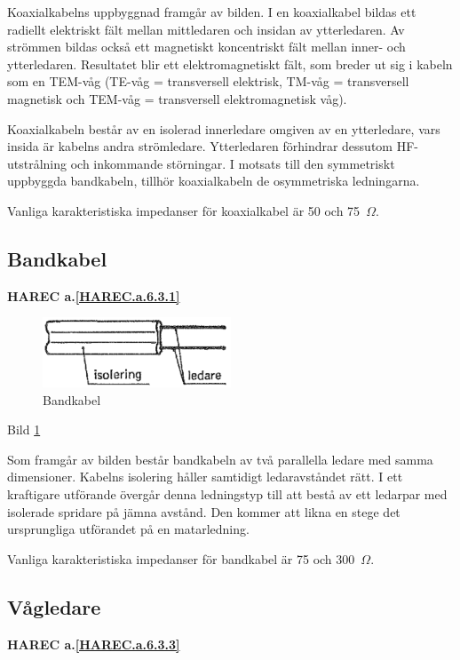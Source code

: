 Koaxialkabelns uppbyggnad framgår av bilden. I en koaxialkabel bildas
ett radiellt elektriskt fält mellan mittledaren och insidan av
ytterledaren. Av strömmen bildas också ett magnetiskt koncentriskt
fält mellan inner- och ytterledaren. Resultatet blir ett
elektromagnetiskt fält, som breder ut sig i kabeln som en TEM-våg
(TE-våg = transversell elektrisk, TM-våg = transversell magnetisk och
TEM-våg = transversell elektromagnetisk våg).

Koaxialkabeln består av en isolerad innerledare omgiven av en
ytterledare, vars insida är kabelns andra strömledare. Ytterledaren
förhindrar dessutom HF-utstrålning och inkommande störningar. I
motsats till den symmetriskt uppbyggda bandkabeln, tillhör
koaxialkabeln de osymmetriska ledningarna.

Vanliga karakteristiska impedanser för koaxialkabel är 50 och 75~\(\Omega\).

\subsection{Bandkabel}
\textbf{
HAREC a.\ref{HAREC.a.6.3.1}\label{myHAREC.a.6.3.1}
}

\begin{figure}
  \includegraphics[width=0.5\textwidth]{images/cropped_pdfs/bild_2_6-25.pdf}
  \caption{Bandkabel}
  \label{fig:bildII6-25}
\end{figure}

Bild \ref{fig:bildII6-25}

Som framgår av bilden består bandkabeln av två parallella ledare med
samma dimensioner. Kabelns isolering håller samtidigt ledaravståndet
rätt. I ett kraftigare utförande övergår denna ledningstyp till att
bestå av ett ledarpar med isolerade spridare på jämna avstånd. Den
kommer att likna en stege det ursprungliga utförandet på en
matarledning.

Vanliga karakteristiska impedanser för bandkabel är 75 och 300~\(\Omega\).

\subsection{Vågledare}
\textbf{
HAREC a.\ref{HAREC.a.6.3.3}\label{myHAREC.a.6.3.3}
}


